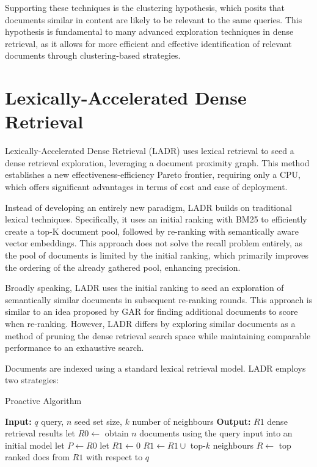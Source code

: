 \documentclass[sigconf,authorversion,nonacm]{acmart}
\begin{document}
Supporting these techniques is the clustering hypothesis\cite{clustering_hypothesis}, which posits that documents similar in
content are likely to be relevant to the same queries. This hypothesis is fundamental to many
advanced exploration techniques in dense retrieval, as it allows for more efficient and effective
identification of relevant documents through clustering-based strategies.

\section{Lexically-Accelerated Dense Retrieval}

Lexically-Accelerated Dense Retrieval (LADR)\cite{ladr} uses lexical retrieval to seed a dense retrieval
exploration, leveraging a document proximity graph. This method establishes a new
effectiveness-efficiency Pareto frontier, requiring only a CPU, which offers significant advantages
in terms of cost and ease of deployment.

Instead of developing an entirely new paradigm, LADR builds on traditional lexical techniques.
Specifically, it uses an initial ranking with BM25 to efficiently create a top-K document pool,
followed by re-ranking with semantically aware vector embeddings. This approach does not solve the
recall problem entirely, as the pool of documents is limited by the initial ranking, which primarily
improves the ordering of the already gathered pool, enhancing precision.

Broadly speaking, LADR uses the initial ranking to seed an exploration of semantically similar
documents in subsequent re-ranking rounds. This approach is similar to an idea proposed by
GAR\cite{gar} for finding additional documents to score when re-ranking. However, LADR differs by
exploring similar documents as a method of pruning the dense retrieval search space while
maintaining comparable performance to an exhaustive search.

Documents are indexed using a standard lexical retrieval model. LADR employs two strategies:

\begin{algorithm}
	\caption{Proactive Algorithm}
	\begin{algorithmic}[1]
		\STATE \textbf{Input:} \( q \) query, \( n \) seed set size, \( k \) number of neighbours
		\STATE \textbf{Output:} \( R1 \) dense retrieval results
		\STATE let \( R0 \leftarrow \) obtain \( n \) documents using the query input into an initial model
		\STATE let \( P \leftarrow R0 \)
		\STATE let \( R1 \leftarrow 0 \)
		\STATE \( R1 \leftarrow R1 \cup \) top-\( k \) neighbours
		\STATE \( R \leftarrow \) top ranked docs from \( R1 \) with respect to \( q \)
	\end{algorithmic}
\end{algorithm}
\end{document}
